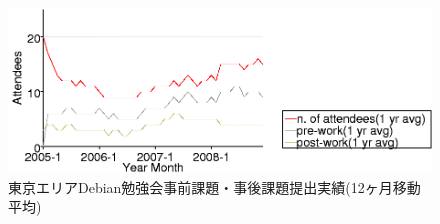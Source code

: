 \documentclass[mingoth,a4paper]{jsarticle}
\begin{document}

\begin{figure}[ht]
 \includegraphics[width=1\hsize]{image200812/memberanalysis/attend.png}
\caption{東京エリアDebian勉強会事前課題・事後課題提出実績(12ヶ月移動平均)}\label{fig:attendandprepostwork}
\end{figure}
\end{document}
